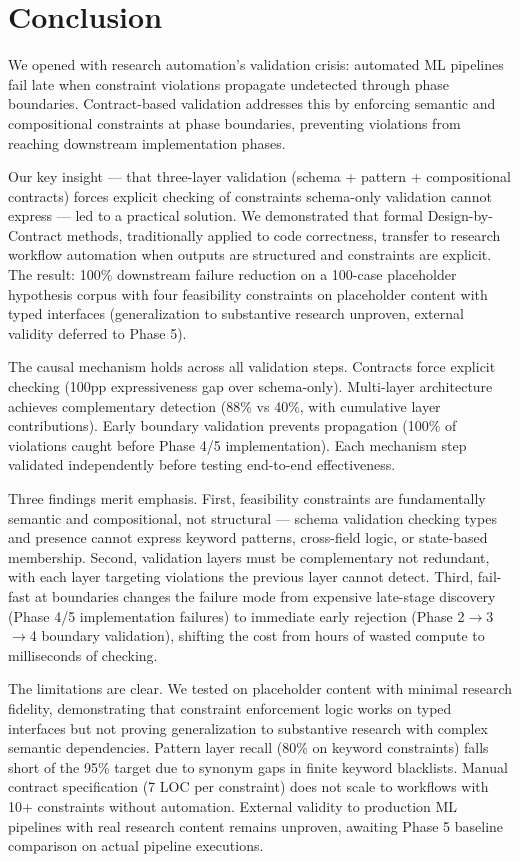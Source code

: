 \section{Conclusion}

We opened with research automation's validation crisis: automated ML pipelines fail late when constraint violations propagate undetected through phase boundaries. Contract-based validation addresses this by enforcing semantic and compositional constraints at phase boundaries, preventing violations from reaching downstream implementation phases.

Our key insight --- that three-layer validation (schema + pattern + compositional contracts) forces explicit checking of constraints schema-only validation cannot express --- led to a practical solution. We demonstrated that formal Design-by-Contract methods, traditionally applied to code correctness, transfer to research workflow automation when outputs are structured and constraints are explicit. The result: 100\% downstream failure reduction on a 100-case placeholder hypothesis corpus with four feasibility constraints on placeholder content with typed interfaces (generalization to substantive research unproven, external validity deferred to Phase 5).

The causal mechanism holds across all validation steps. Contracts force explicit checking (100pp expressiveness gap over schema-only). Multi-layer architecture achieves complementary detection (88\% vs 40\%, with cumulative layer contributions). Early boundary validation prevents propagation (100\% of violations caught before Phase 4/5 implementation). Each mechanism step validated independently before testing end-to-end effectiveness.

Three findings merit emphasis. First, feasibility constraints are fundamentally semantic and compositional, not structural --- schema validation checking types and presence cannot express keyword patterns, cross-field logic, or state-based membership. Second, validation layers must be complementary not redundant, with each layer targeting violations the previous layer cannot detect. Third, fail-fast at boundaries changes the failure mode from expensive late-stage discovery (Phase 4/5 implementation failures) to immediate early rejection (Phase 2$\rightarrow$3$\rightarrow$4 boundary validation), shifting the cost from hours of wasted compute to milliseconds of checking.

The limitations are clear. We tested on placeholder content with minimal research fidelity, demonstrating that constraint enforcement logic works on typed interfaces but not proving generalization to substantive research with complex semantic dependencies. Pattern layer recall (80\% on keyword constraints) falls short of the 95\% target due to synonym gaps in finite keyword blacklists. Manual contract specification (7 LOC per constraint) does not scale to workflows with 10+ constraints without automation. External validity to production ML pipelines with real research content remains unproven, awaiting Phase 5 baseline comparison on actual pipeline executions.

